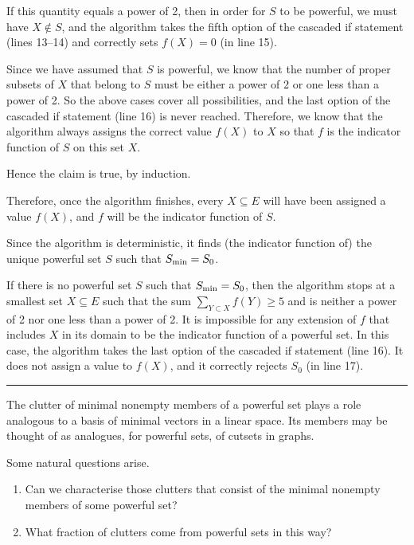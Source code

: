 \documentclass[12pt]{article}
\def\qed{\hfill \rule{4pt}{7pt}}
\begin{document}
If this quantity equals a power of 2, then in order for $S$ to be powerful, we must
have $X\not\in S$, and the algorithm takes the fifth option of the cascaded if statement
(lines 13--14) and correctly sets $f(X)=0$ (in line 15).

Since we have assumed that $S$ is powerful, we know that the number of proper subsets of $X$
that belong to $S$ must be either a power of 2 or one less than a power of 2.  So the above
cases cover all possibilities, and the last option of the cascaded if statement (line 16) is never reached.
Therefore, we know that the algorithm always assigns the correct value $f(X)$ to $X$ so
that $f$ is the indicator function of $S$ on this set $X$.

Hence the claim is true, by induction.

Therefore, once the algorithm finishes, every $X\subseteq E$ will have been assigned a value
$f(X)$, and $f$ will be the indicator function of $S$.

Since the algorithm is deterministic, it finds (the indicator function of) the unique powerful set $S$
such that $S_{\scriptsize\hbox{min}}=S_0$.

If there is no powerful set $S$ such that $S_{\scriptsize\hbox{min}}=S_0$, then the algorithm
stops at a smallest set $X\subseteq E$
such that the sum $\sum_{Y\subset X} f(Y)\ge5$
and is neither a power of 2 nor one less than a power of 2.
It is impossible for any extension of
$f$ that includes $X$ in its domain to be the indicator function of a powerful set.
In this case, the algorithm takes the last option of the cascaded if
statement (line 16).  It does not assign a value to $f(X)$,
and it correctly rejects $S_0$ (in line 17).\qed

The clutter of minimal nonempty members of a powerful set plays a role
analogous to a basis of minimal vectors in a linear space.
Its members may be thought of as analogues, for powerful sets, of cutsets in graphs.

Some natural questions arise.
\begin{enumerate}
\item Can we characterise those clutters that consist of the minimal nonempty members of some powerful set?
\item What fraction of clutters come from powerful sets in this way?
\end{enumerate}



\end{document}
